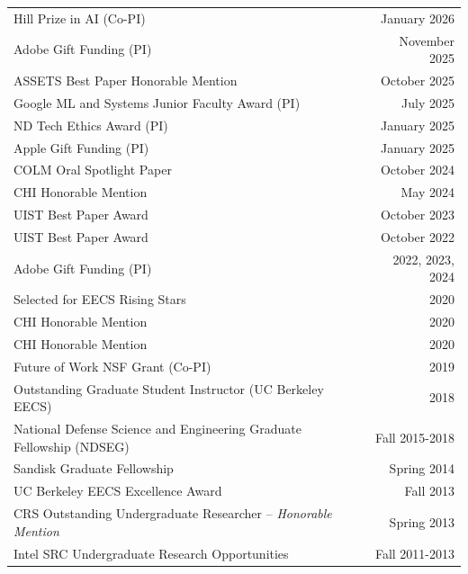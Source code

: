 \begin{longtable}{Xr}
	Hill Prize in AI (Co-PI) & January 2026 \\
	Adobe Gift Funding (PI) & November 2025 \\
	ASSETS Best Paper Honorable Mention & October 2025 \\
	Google ML and Systems Junior Faculty Award (PI) & July 2025 \\
	ND Tech Ethics Award (PI) & January 2025 \\
	Apple Gift Funding (PI) & January 2025 \\
	COLM Oral Spotlight Paper & October 2024 \\
	CHI Honorable Mention & May 2024 \\
	UIST Best Paper Award & October 2023 \\
	UIST Best Paper Award & October 2022 \\
	Adobe Gift Funding (PI) & 2022, 2023, 2024 \\
	Selected for EECS Rising Stars & 2020 \\
	CHI Honorable Mention & 2020 \\
	CHI Honorable Mention & 2020 \\
	Future of Work NSF Grant (Co-PI) & 2019 \\
	Outstanding Graduate Student Instructor (UC Berkeley EECS) & 2018 \\
	National Defense Science and Engineering Graduate Fellowship (NDSEG) & Fall 2015-2018 \\
	Sandisk Graduate Fellowship & Spring 2014 \\
	UC Berkeley EECS Excellence Award & Fall 2013 \\
	CRS Outstanding Undergraduate Researcher -- \textit{Honorable Mention} & Spring 2013 \\
	Intel SRC Undergraduate Research Opportunities & Fall 2011-2013 \\
\end{longtable}